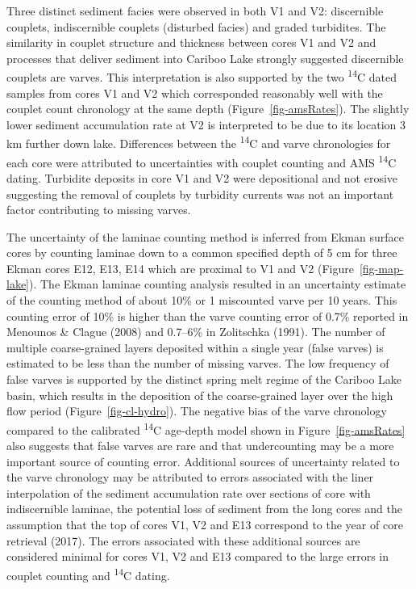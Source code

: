 \documentclass[
  letterpaper,
  DIV=11,
  numbers=noendperiod]{scrartcl}
\begin{document}
Three distinct sediment facies were observed in both V1 and V2:
discernible couplets, indiscernible couplets (disturbed facies) and
graded turbidites. The similarity in couplet structure and thickness
between cores V1 and V2 and processes that deliver sediment into Cariboo
Lake strongly suggested discernible couplets are varves. This
interpretation is also supported by the two \textsuperscript{14}C dated
samples from cores V1 and V2 which corresponded reasonably well with the
couplet count chronology at the same depth (Figure~\ref{fig-amsRates}).
The slightly lower sediment accumulation rate at V2 is interpreted to be
due to its location 3 km further down lake. Differences between the
\textsuperscript{14}C and varve chronologies for each core were
attributed to uncertainties with couplet counting and AMS
\textsuperscript{14}C dating. Turbidite deposits in core V1 and V2 were
depositional and not erosive suggesting the removal of couplets by
turbidity currents was not an important factor contributing to missing
varves.

The uncertainty of the laminae counting method is inferred from Ekman
surface cores by counting laminae down to a common specified depth of 5
cm for three Ekman cores E12, E13, E14 which are proximal to V1 and V2
(Figure~\ref{fig-map-lake}). The Ekman laminae counting analysis
resulted in an uncertainty estimate of the counting method of about 10\%
or 1 miscounted varve per 10 years. This counting error of 10\% is
higher than the varve counting error of 0.7\% reported in Menounos \&
Clague (2008) and 0.7--6\% in Zolitschka (1991). The number of multiple
coarse-grained layers deposited within a single year (false varves) is
estimated to be less than the number of missing varves. The low
frequency of false varves is supported by the distinct spring melt
regime of the Cariboo Lake basin, which results in the deposition of the
coarse-grained layer over the high flow period
(Figure~\ref{fig-cl-hydro}). The negative bias of the varve chronology
compared to the calibrated \textsuperscript{14}C age-depth model shown
in Figure~\ref{fig-amsRates} also suggests that false varves are rare
and that undercounting may be a more important source of counting error.
Additional sources of uncertainty related to the varve chronology may be
attributed to errors associated with the liner interpolation of the
sediment accumulation rate over sections of core with indiscernible
laminae, the potential loss of sediment from the long cores and the
assumption that the top of cores V1, V2 and E13 correspond to the year
of core retrieval (2017). The errors associated with these additional
sources are considered minimal for cores V1, V2 and E13 compared to the
large errors in couplet counting and \textsuperscript{14}C dating.
\end{document}
